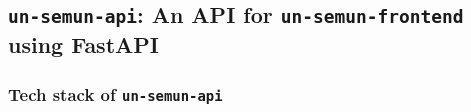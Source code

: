 
\subsection{\texttt{un-semun-api}: An API for \texttt{un-semun-frontend} using FastAPI} \label{ssec:un-semun-api-an-api-for-un-semun-frontend-using-fastapi}
\subsubsection*{Tech stack of \texttt{un-semun-api}} \label{sssec:tech-stack-of-un-semun-api}
